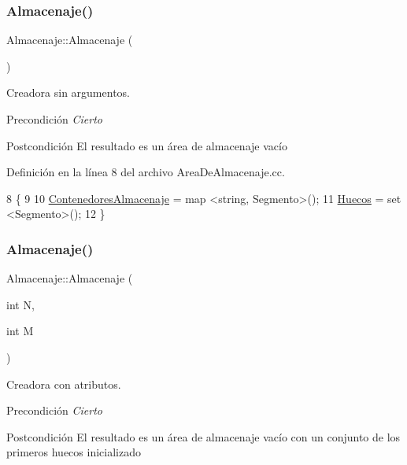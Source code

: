 \subsubsection{\texorpdfstring{Almacenaje()}{Almacenaje()}\hspace{0.1cm}{\footnotesize\ttfamily [1/2]}}
{\footnotesize\ttfamily Almacenaje\+::\+Almacenaje (\begin{DoxyParamCaption}{ }\end{DoxyParamCaption})}



Creadora sin argumentos. 

\begin{DoxyPrecond}{Precondición}
{\itshape Cierto} 
\end{DoxyPrecond}
\begin{DoxyPostcond}{Postcondición}
El resultado es un área de almacenaje vacío 
\end{DoxyPostcond}


Definición en la línea 8 del archivo Area\+De\+Almacenaje.\+cc.


\begin{DoxyCode}
8                        \{
9     
10     \hyperlink{class_almacenaje_ab3cfe0feaf244094a7e2c5225ee681e6}{ContenedoresAlmacenaje} = map <string, Segmento>();
11     \hyperlink{class_almacenaje_ac7f1f8559babe3ac7841bb7f9e50d79a}{Huecos} = set <Segmento>();
12 \}
\end{DoxyCode}
\mbox{\label{class_almacenaje_a647530e3470da788413fe0288eeca339}} 
\subsubsection{\texorpdfstring{Almacenaje()}{Almacenaje()}\hspace{0.1cm}{\footnotesize\ttfamily [2/2]}}
{\footnotesize\ttfamily Almacenaje\+::\+Almacenaje (\begin{DoxyParamCaption}\item[{int}]{N,  }\item[{int}]{M }\end{DoxyParamCaption})}



Creadora con atributos. 

\begin{DoxyPrecond}{Precondición}
{\itshape Cierto} 
\end{DoxyPrecond}
\begin{DoxyPostcond}{Postcondición}
El resultado es un área de almacenaje vacío con un conjunto de los primeros huecos inicializado 
\end{DoxyPostcond}


